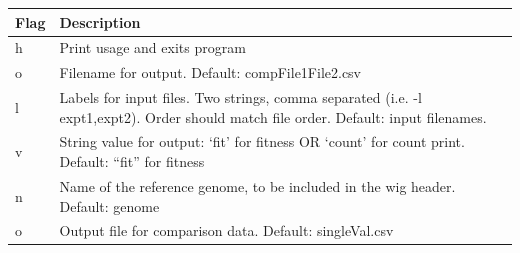\documentclass[11pt,]{article}
\begin{document}
\begin{longtable}[]{@{}ll@{}}
\toprule
\begin{minipage}[b]{0.06\columnwidth}\raggedright\strut
Flag\strut
\end{minipage} & \begin{minipage}[b]{0.88\columnwidth}\raggedright\strut
Description\strut
\end{minipage}\tabularnewline
\midrule
\endhead
\begin{minipage}[t]{0.06\columnwidth}\raggedright\strut
h\strut
\end{minipage} & \begin{minipage}[t]{0.88\columnwidth}\raggedright\strut
Print usage and exits program\strut
\end{minipage}\tabularnewline
\begin{minipage}[t]{0.06\columnwidth}\raggedright\strut
o\strut
\end{minipage} & \begin{minipage}[t]{0.88\columnwidth}\raggedright\strut
Filename for output. Default: compFile1File2.csv\strut
\end{minipage}\tabularnewline
\begin{minipage}[t]{0.06\columnwidth}\raggedright\strut
l\strut
\end{minipage} & \begin{minipage}[t]{0.88\columnwidth}\raggedright\strut
Labels for input files. Two strings, comma separated (i.e. -l
expt1,expt2). Order should match file order. Default: input
filenames.\strut
\end{minipage}\tabularnewline
\begin{minipage}[t]{0.06\columnwidth}\raggedright\strut
v\strut
\end{minipage} & \begin{minipage}[t]{0.88\columnwidth}\raggedright\strut
String value for output: `fit' for fitness OR `count' for count print.
Default: ``fit'' for fitness\strut
\end{minipage}\tabularnewline
\begin{minipage}[t]{0.06\columnwidth}\raggedright\strut
n\strut
\end{minipage} & \begin{minipage}[t]{0.88\columnwidth}\raggedright\strut
Name of the reference genome, to be included in the wig header. Default:
genome\strut
\end{minipage}\tabularnewline
\begin{minipage}[t]{0.06\columnwidth}\raggedright\strut
o\strut
\end{minipage} & \begin{minipage}[t]{0.88\columnwidth}\raggedright\strut
Output file for comparison data. Default: singleVal.csv\strut
\end{minipage}\tabularnewline
\bottomrule
\end{longtable}
\end{document}

